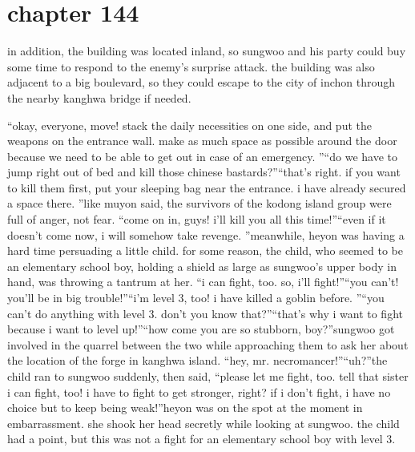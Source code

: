 \section{chapter 144}

                            in addition, the building was located inland, so sungwoo and his party could buy some time to respond to the enemy’s surprise attack.
 the building was also adjacent to a big boulevard, so they could escape to the city of inchon through the nearby kanghwa bridge if needed.





“okay, everyone, move! stack the daily necessities on one side, and put the weapons on the entrance wall.
 make as much space as possible around the door because we need to be able to get out in case of an emergency.
”“do we have to jump right out of bed and kill those chinese bastards?”“that’s right.
 if you want to kill them first, put your sleeping bag near the entrance.
 i have already secured a space there.
”like muyon said, the survivors of the kodong island group were full of anger, not fear.
“come on in, guys! i’ll kill you all this time!”“even if it doesn’t come now, i will somehow take revenge.
”meanwhile, heyon was having a hard time persuading a little child.
 for some reason, the child, who seemed to be an elementary school boy, holding a shield as large as sungwoo’s upper body in hand, was throwing a tantrum at her.
“i can fight, too.
 so, i’ll fight!”“you can’t! you’ll be in big trouble!”“i’m level 3, too! i have killed a goblin before.
”“you can’t do anything with level 3.
 don’t you know that?”“that’s why i want to fight because i want to level up!”“how come you are so stubborn, boy?”sungwoo got involved in the quarrel between the two while approaching them to ask her about the location of the forge in kanghwa island.
“hey, mr.
 necromancer!”“uh?”the child ran to sungwoo suddenly, then said, “please let me fight, too.
 tell that sister i can fight, too! i have to fight to get stronger, right? if i don’t fight, i have no choice but to keep being weak!”heyon was on the spot at the moment in embarrassment.
 she shook her head secretly while looking at sungwoo.
 the child had a point, but this was not a fight for an elementary school boy with level 3.

